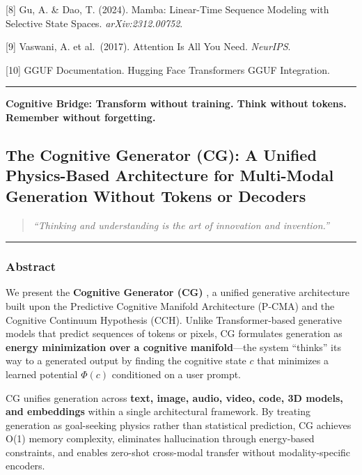 \documentclass[
  11pt,
  a4paper,
]{article}
\begin{document}
{[}8{]} Gu, A. \& Dao, T. (2024). Mamba: Linear-Time Sequence Modeling
with Selective State Spaces. \emph{arXiv:2312.00752}.

{[}9{]} Vaswani, A. et al.~(2017). Attention Is All You Need.
\emph{NeurIPS}.

{[}10{]} GGUF Documentation. Hugging Face Transformers GGUF Integration.

\begin{center}\rule{0.5\linewidth}{0.5pt}\end{center}

\textbf{Cognitive Bridge: Transform without training. Think without
tokens. Remember without forgetting.}

\newpage

\subsection{The Cognitive Generator (CG): A Unified Physics-Based
Architecture for Multi-Modal Generation Without Tokens or
Decoders}\label{the-cognitive-generator-cg-a-unified-physics-based-architecture-for-multi-modal-generation-without-tokens-or-decoders}

\begin{quote}
\emph{``Thinking and understanding is the art of innovation and
invention.''}
\end{quote}

\begin{center}\rule{0.5\linewidth}{0.5pt}\end{center}

\subsubsection{Abstract}\label{abstract-3}

We present the \textbf{Cognitive Generator (CG)} , a unified generative
architecture built upon the Predictive Cognitive Manifold Architecture
(P-CMA) and the Cognitive Continuum Hypothesis (CCH). Unlike
Transformer-based generative models that predict sequences of tokens or
pixels, CG formulates generation as \textbf{energy minimization over a
cognitive manifold}---the system ``thinks'' its way to a generated
output by finding the cognitive state \(c\) that minimizes a learned
potential \(\Phi(c)\) conditioned on a user prompt.

CG unifies generation across \textbf{text, image, audio, video, code, 3D
models, and embeddings} within a single architectural framework. By
treating generation as goal-seeking physics rather than statistical
prediction, CG achieves O(1) memory complexity, eliminates hallucination
through energy-based constraints, and enables zero-shot cross-modal
transfer without modality-specific encoders.
\end{document}
